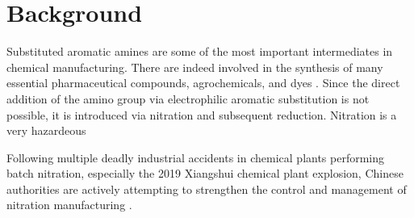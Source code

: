 \section{Background}

Substituted aromatic amines are some of the most important intermediates in chemical manufacturing. There are indeed involved in the synthesis of many essential pharmaceutical compounds, agrochemicals, and dyes \cite{vogt_amines_2000}. Since the direct addition of the amino group via electrophilic aromatic substitution is not possible, it is introduced via nitration and subsequent reduction. Nitration is a very hazardeous 

Following multiple deadly industrial accidents in chemical plants performing batch nitration, especially the 2019 Xiangshui chemical plant explosion, Chinese authorities are actively attempting to strengthen the control and management of nitration manufacturing \cite{el_diario_china_2019}.


